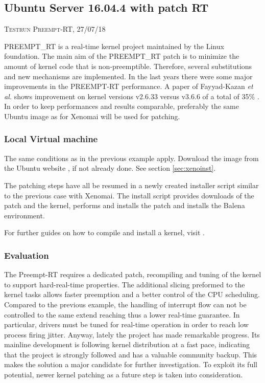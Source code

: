 \documentclass[]{scrartcl}
\begin{document}
\subsection{Ubuntu Server 16.04.4 with patch RT}

{\small\textsc{Testrun Preempt-RT, 27/07/18} \bigskip}

PREEMPT\_RT is a real-time kernel project maintained by the Linux foundation. 
The main aim of the PREEMPT\_RT patch is to minimize the amount of kernel code that is non-preemptible. Therefore, several substitutions and new mechanisms are implemented.
In the last years there were some major improvements in the PREEMPT-RT performance. A paper of Fayyad-Kazan \textit{et al.} shows improvement on kernel versions v2.6.33 versus v3.6.6 of a total of 35\% \cite{Fayyad-Kazanetal2014}. In order to keep performances and results comparable, preferably the same Ubuntu image as for Xenomai will be used for patching.

\subsubsection{Local Virtual machine}

The same conditions as in the previous example apply. Download the image from the Ubuntu website \cite{ubuntu02}, if not already done. See section \ref{sec:xenoinst}.

The patching steps have all be resumed in a newly created installer script similar to the previous case with Xenomai. The install script provides downloads of the patch and the kernel, performs and installs the patch and installs the Balena environment.

For further guides on how to compile and install a kernel, visit \cite{misc01}.

\subsubsection{Evaluation}

The Preempt-RT requires a dedicated patch, recompiling and tuning of the kernel to support hard-real-time properties. The additional slicing preformed to the kernel tasks allows faster preemption and a better control of the CPU scheduling.
Compared to the previous example, the handling of interrupt flow can not be controlled to the same extend reaching thus a lower real-time guarantee.
In particular, drivers must be tuned for real-time operation in order to reach low process firing jitter.
Anyway, lately the project has made remarkable progress.
Its mainline development is following kernel distribution at a fast pace, indicating that the project is strongly followed and has a valuable community backup. This makes the solution a major candidate for further investigation.
To exploit its full potential, newer kernel patching as a future step is taken into consideration.
\end{document}
